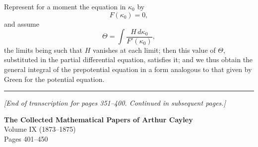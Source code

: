 \documentclass[11pt,a4paper]{book}
\begin{document}
\begin{art}\label{art:125}
Represent for a moment the equation in $\kappa_0$ by
\[
F(\kappa_0) = 0,
\]
and assume
\[
\Theta = \int \frac{H \, d\kappa_0}{F'(\kappa_0)},
\]
the limits being such that $H$ vanishes at each limit; then this value of $\Theta$, substituted in the partial differential equation, satisfies it; and we thus obtain the general integral of the prepotential equation in a form analogous to that given by Green for the potential equation.
\end{art}

\vspace{1cm}
\begin{center}
\rule{0.5\textwidth}{0.4pt}
\end{center}

\vspace{0.5cm}
\noindent\textit{[End of transcription for pages 351--400. Continued in subsequent pages.]}
\clearpage


\begin{center}
\Large\textbf{The Collected Mathematical Papers of Arthur Cayley}\\[6pt]
\large Volume IX (1873--1875)\\[12pt]
\normalsize Pages 401--450
\end{center}


\newpage
\end{document}
